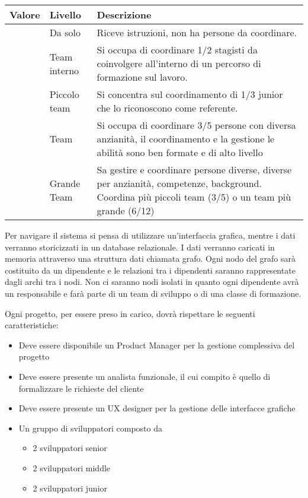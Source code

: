 \documentclass[a4paper]{extarticle}
\begin{document}
\begin{tabularx}{\textwidth} { 
  | >{\centering\arraybackslash}X 
  | >{\centering\arraybackslash}X 
  | >{\centering\arraybackslash}X | }
 \hline
 Valore & Livello & Descrizione \\
 \hline
 1  & Da solo  & Riceve istruzioni, non ha persone da coordinare.  \\
 \hline
 2  & Team interno  & Si occupa di coordinare 1/2 stagisti da coinvolgere all'interno di un percorso di formazione sul lavoro.  \\
 \hline
 3  & Piccolo team  & Si concentra sul coordinamento di 1/3 junior che lo riconoscono come referente.  \\
 \hline
 4  & Team  & Si occupa di coordinare 3/5 persone con diversa anzianità, il coordinamento e la gestione
le abilità sono ben formate e di alto livello  \\
 \hline
 5  & Grande Team  & Sa gestire e coordinare persone diverse, diverse per anzianità, competenze, background.
Coordina più piccoli team (3/5) o un team più grande (6/12) \\
\hline
\end{tabularx}


Per navigare il sistema si pensa di utilizzare un'interfaccia grafica, mentre i dati verranno storicizzati in un database 
relazionale. I dati verranno caricati in memoria attraverso una struttura dati chiamata grafo. Ogni nodo del grafo sarà 
costituito da un dipendente e le relazioni tra i dipendenti saranno rappresentate dagli archi tra i nodi. Non ci saranno 
nodi isolati in quanto ogni dipendente avrà un responsabile e farà parte di un team di sviluppo o di una classe di formazione. 

Ogni progetto, per essere preso in carico, dovrà rispettare le seguenti caratteristiche:

\begin{itemize}
	\item Deve essere disponibile un Product Manager per la gestione complessiva del progetto
	\item Deve essere presente un analista funzionale, il cui compito è quello di formalizzare le richieste del cliente
	\item Deve essere presente un UX designer per la gestione delle interfacce grafiche
	\item Un gruppo di sviluppatori composto da
	\begin{itemize}
		\item 2 sviluppatori senior
		\item 2 sviluppatori middle
		\item 2 sviluppatori junior
	\end{itemize}
\end{itemize}
\end{document}
